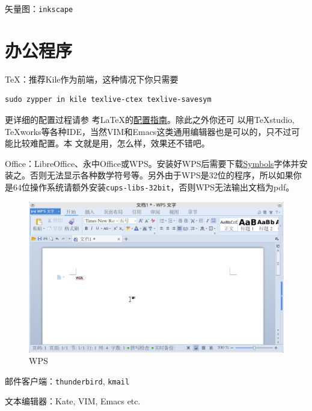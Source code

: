 \documentclass[11pt,openany]{book}
\newcommand{\soft}[1]{\texttt{\textcolor{dgreen}{#1}}}
\begin{document}
矢量图：\soft{inkscape}
\section{办公程序}
\TeX ：推荐Kile作为前端，这种情况下你只需要
\begin{Verbatim}[formatcom=\color{codec}]
    sudo zypper in kile texlive-ctex texlive-savesym
\end{Verbatim}
更详细的配置过程请参
考\LaTeX 的\href{https://forum.suse.org.cn/viewtopic.php?f=6&t=2392&p=18750}{配置指南}。除此之外你还可
以用\TeX studio, \TeX works等各种IDE，当然VIM和Emacs这类通用编辑器也是可以的，只不过可能比较难配置。本
文就是用，怎么样，效果还不错吧。

Office：LibreOffice、永中Office或WPS。安装好WPS后需要下载\href{http://pan.baidu.com/s/1ntMEU2P}{Symbols}字体并安装之。否则无法显示各种数学符号等。另外由于WPS是32位的程序，所以如果你是64位操作系统请额外安装\soft{cups-libs-32bit}，否则WPS无法输出文档为pdf。
\begin{figure}[htbp]
\centering
\includegraphics[width=\textwidth]{./pic/wps.png} 
\caption{WPS}\label{wps}
\end{figure}
邮件客户端：\soft{thunderbird}, \soft{kmail}

文本编辑器：Kate, VIM, Emacs etc.
\end{document}
